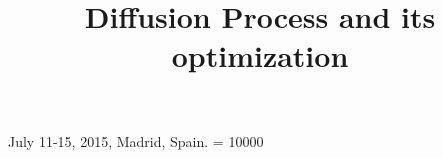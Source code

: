 \documentclass{sig-alternate}
\begin{document}
 {July 11-15, 2015, Madrid, Spain.}
    \widowpenalty = 10000
%

\title{Diffusion Process and its optimization}
%
%
%
%
%
\end{document}
